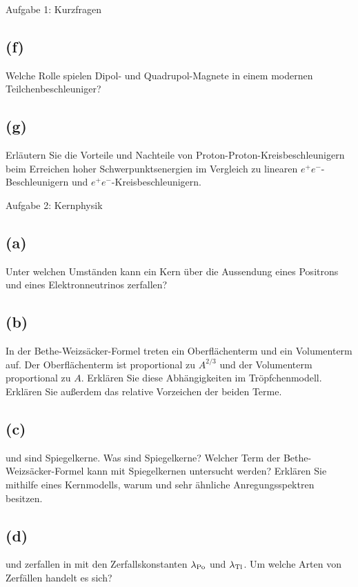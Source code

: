 \begin{aufgabe}{Aufgabe 1: Kurzfragen}
    \subsection{(f)}
    Welche Rolle spielen Dipol- und Quadrupol-Magnete in einem modernen Teilchenbeschleuniger?

    \subsection{(g)}
    Erläutern Sie die Vorteile und Nachteile von Proton-Proton-Kreisbeschleunigern beim Erreichen hoher Schwerpunktsenergien
    im Vergleich zu linearen $e^+ e^-$-Beschleunigern und $e^+ e^-$-Kreisbeschleunigern.
\end{aufgabe}

\begin{aufgabe}{Aufgabe 2: Kernphysik}
    \subsection{(a)}
    Unter welchen Umständen kann ein Kern über die Aussendung eines Positrons und eines Elektronneutrinos zerfallen?

    \subsection{(b)}
    In der Bethe-Weizsäcker-Formel treten ein Oberflächenterm und ein Volumenterm auf.
    Der Oberflächenterm ist proportional zu $A^{2/3}$ und der Volumenterm proportional zu $A$.
    Erklären Sie diese Abhängigkeiten im Tröpfchenmodell.
    Erklären Sie außerdem das relative Vorzeichen der beiden Terme.

    \subsection{(c)}
     und  sind Spiegelkerne.
    Was sind Spiegelkerne?
    Welcher Term der Bethe-Weizsäcker-Formel kann mit Spiegelkernen untersucht werden?
    Erklären Sie mithilfe eines Kernmodells,
    warum  und  sehr ähnliche Anregungsspektren besitzen.

    \subsection{(d)}
     und  zerfallen in  mit den Zerfallskonstanten $\lambda_{\ce{Po}}$ und $\lambda_{\ce{Tl}}$.
    Um welche Arten von Zerfällen handelt es sich?


\end{aufgabe}
